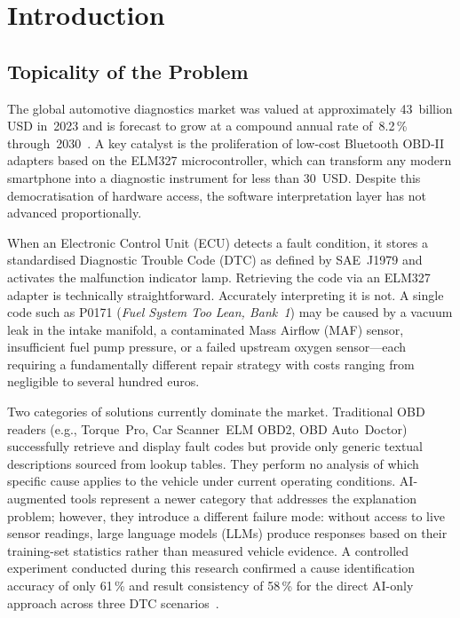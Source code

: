\chapter*{Introduction}

\section*{Topicality of the Problem}

The global automotive diagnostics market was valued at approximately 43~billion USD in~2023 and is forecast to grow at a compound annual rate of~8.2\,\% through~2030~\cite{markets2023}.
A key catalyst is the proliferation of low-cost Bluetooth OBD-II adapters based on the ELM327 microcontroller, which can transform any modern smartphone into a diagnostic instrument for less than 30~USD.
Despite this democratisation of hardware access, the software interpretation layer has not advanced proportionally.

When an Electronic Control Unit (ECU) detects a fault condition, it stores a standardised Diagnostic Trouble Code (DTC) as defined by SAE~J1979 and activates the malfunction indicator lamp.
Retrieving the code via an ELM327 adapter is technically straightforward.
Accurately interpreting it is not.
A single code such as P0171 (\textit{Fuel System Too Lean, Bank~1}) may be caused by a vacuum leak in the intake manifold, a contaminated Mass Airflow (MAF) sensor, insufficient fuel pump pressure, or a failed upstream oxygen sensor---each requiring a fundamentally different repair strategy with costs ranging from negligible to several hundred euros.

Two categories of solutions currently dominate the market.
Traditional OBD readers (e.g., Torque~Pro, Car Scanner~ELM OBD2, OBD Auto~Doctor) successfully retrieve and display fault codes but provide only generic textual descriptions sourced from lookup tables.
They perform no analysis of which specific cause applies to the vehicle under current operating conditions.
AI-augmented tools represent a newer category that addresses the explanation problem; however, they introduce a different failure mode: without access to live sensor readings, large language models (LLMs) produce responses based on their training-set statistics rather than measured vehicle evidence.
A controlled experiment conducted during this research confirmed a cause identification accuracy of only 61\,\% and result consistency of 58\,\% for the direct AI-only approach across three DTC scenarios~\cite{zhang2024gpt}.

